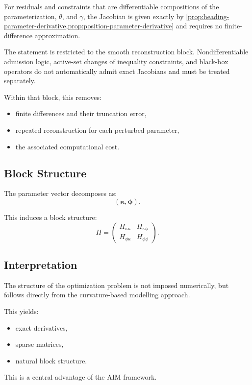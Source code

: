 \begin{proposition}
\label{prop:exact-jacobians-smooth-block}
For residuals and constraints that are differentiable compositions of the
parameterization, \(\theta\), and \(\gamma\), the Jacobian is given exactly
by
\cref{prop:heading-parameter-derivative,prop:position-parameter-derivative}
and requires no finite-difference approximation.
\end{proposition}

The statement is restricted to the smooth reconstruction block.
Nondifferentiable admission logic, active-set changes of inequality
constraints, and black-box operators do not automatically admit exact
Jacobians and must be treated separately.

Within that block, this removes:
\begin{itemize}
\item finite differences and their truncation error,
\item repeated reconstruction for each perturbed parameter,
\item the associated computational cost.
\end{itemize}

\subsection{Block Structure}

The parameter vector decomposes as:
\[
(\boldsymbol{\kappa}, \boldsymbol{\phi}).
\]

This induces a block structure:
\[
H =
\begin{pmatrix}
H_{\kappa\kappa} & H_{\kappa\phi} \\
H_{\phi\kappa} & H_{\phi\phi}
\end{pmatrix}.
\]

\subsection{Interpretation}

\begin{summary}
The structure of the optimization problem is not imposed numerically,
but follows directly from the curvature-based modelling approach.

This yields:
\begin{itemize}
\item exact derivatives,
\item sparse matrices,
\item natural block structure.
\end{itemize}

This is a central advantage of the AIM framework.
\end{summary}
